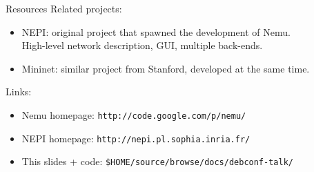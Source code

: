 \documentclass{beamer}
\begin{document}
\begin{frame}{Resources}
  Related projects:\\
  \begin{itemize}
  \item NEPI: original project that spawned the development of Nemu.\\
  High-level network description, GUI, multiple back-ends.
  \item Mininet: similar project from Stanford, developed at the same time.
  \end{itemize}
  \hfill

  Links:\\
  \begin{itemize}
  \item Nemu homepage: \texttt{http://code.google.com/p/nemu/}
  \item NEPI homepage: \texttt{http://nepi.pl.sophia.inria.fr/}
  \item This slides + code:
  \texttt{\$HOME/source/browse/docs/debconf-talk/}
  \end{itemize}
\end{frame}
\end{document}
